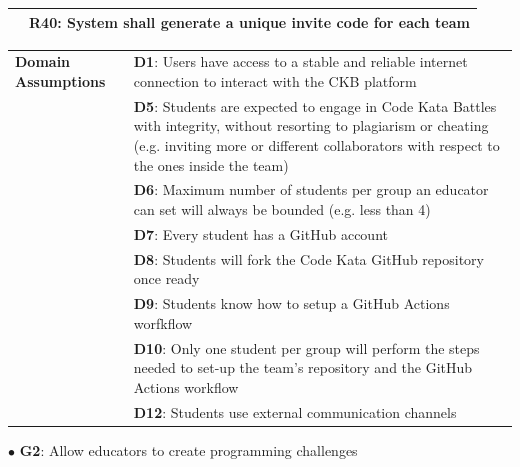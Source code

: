 \begin{center}
\begin{tabular}{ |m{3cm}|m{10cm}| }
        & \textbf{R40}: System shall generate a unique invite code for each team \\
        \hline
    \end{tabular}
    \begin{tabular}{ |m{3cm}|m{10cm}| }
        \hline
        \textbf{Domain \newline Assumptions} 
        & \textbf{D1}: Users have access to a stable and reliable internet connection to interact with the CKB platform \\
        & \textbf{D5}: Students are expected to engage in Code Kata Battles with integrity, without resorting to plagiarism or cheating (e.g. inviting more or different collaborators with respect to the ones inside the team) \\
        & \textbf{D6}: Maximum number of students per group an educator can set will always be bounded (e.g. less than 4) \\
        & \textbf{D7}: Every student has a GitHub account \\
        & \textbf{D8}: Students will fork the Code Kata GitHub repository once ready \\
        & \textbf{D9}: Students know how to setup a GitHub Actions worfkflow \\
        & \textbf{D10}: Only one student per group will perform the steps needed to set-up the team's repository and the GitHub Actions workflow \\
        & \textbf{D12}: Students use external communication channels \\
        \hline
    \end{tabular}
\end{center}
\newpage
$\bullet$ \textbf{G2}: Allow educators to create programming challenges
